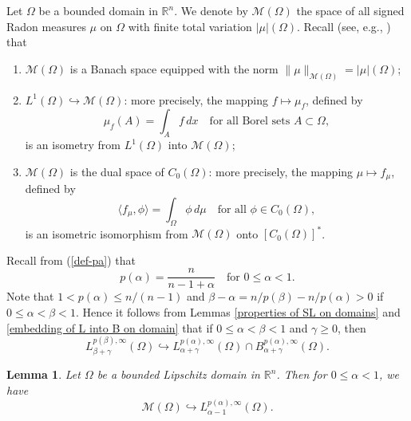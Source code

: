 \documentclass[reqno,centertags,11pt]{amsart}
\newtheorem{lem}[thm]{Lemma}
\theoremstyle{definition}
\numberwithin{thm}{section}
\numberwithin{equation}{section}
\newcommand{\R}{{\mathbb{R}}}
\begin{document}
Let $\Omega$ be a bounded domain in $\R^n$.
We denote by $\mathcal{M}  (\Omega )$ the space  of all signed  Radon measures $\mu$ on $\Omega$ with finite total variation $  |\mu |(\Omega )$. Recall (see, e.g.,  \cite[Chapter 7]{Folland}) that
\begin{enumerate}[{\upshape(i)}]
\item  $\mathcal{M}  (\Omega )$ is a Banach space equipped with the norm
$\|\mu \|_{\mathcal{M}  (\Omega )}=|\mu |(\Omega )$;
\item $L^1 (\Omega ) \hookrightarrow \mathcal{M}  (\Omega )$: more precisely, the mapping $f \mapsto \mu_f$, defined by
\[
\mu_f (A) =\int_A f \, dx \quad\mbox{for all Borel sets}\,\,A \subset \Omega ,
\]
is an isometry from $L^1 (\Omega )$ into  $\mathcal{M}  (\Omega )$;
\item $  \mathcal{M}  (\Omega )$ is the dual space of
$C_0 (\Omega )$: more precisely, the mapping $\mu \mapsto f_\mu$, defined by
\[
\langle f_\mu ,\phi \rangle =\int_\Omega \phi \, d\mu \quad\mbox{for all}\,\,\phi \in C_0 (\Omega),
\]
is an isometric isomorphism from  $\mathcal{M}  (\Omega )$ onto $\left[ C_0 (\Omega ) \right]^*$.
\end{enumerate}

\medskip
Recall from  (\ref{def-pa}) that
\[
p(\alpha) =\frac{n}{n-1+\alpha} \quad\mbox{for}\,\,  0 \le   \alpha < 1.
\]
Note that $1< p(\alpha) \le  n/(n-1)$ and
$\beta -\alpha  = n/p(\beta) -n/p(\alpha)  >0$ if $0 \le  \alpha <  \beta  < 1$.
Hence it follows from Lemmas \ref{properties of SL on domains} and \ref{embedding of L into B on domain} that if $0 \le  \alpha <  \beta  < 1$ and $\gamma \ge 0$, then
\begin{equation}\label{embedding of L into L and B}
L_{\beta+\gamma}^{p(\beta),\infty}(\Omega )\hookrightarrow L_{\alpha+\gamma}^{p(\alpha),\infty}(\Omega ) \cap B_{\alpha+\gamma}^{p(\alpha),\infty}(\Omega ).
\end{equation}



\begin{lem}\label{embedding of M} Let $\Omega$ be a  bounded Lipschitz domain in $\R^n$. Then for $0 \le  \alpha < 1$, we have
\[
\mathcal{M}  (\Omega ) \hookrightarrow L_{\alpha-1}^{p(\alpha),\infty}(\Omega ) .
\]
\end{lem}
\end{document}
